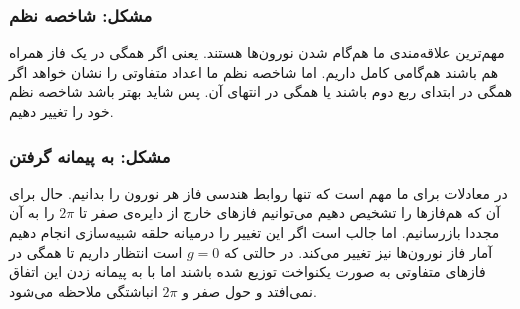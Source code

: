 \documentclass[12pt,onecolumn,a4paper]{article}
\begin{document}
\subsubsection{مشکل: شاخصه نظم}
مهم‌ترین علاقه‌مندی ما هم‌گام شدن نورون‌ها هستند. یعنی اگر همگی در یک فاز همراه هم باشند هم‌گامی کامل داریم. اما شاخصه نظم ما اعداد متفاوتی را نشان خواهد اگر همگی در ابتدای ربع دوم باشند یا همگی در انتهای آن. پس شاید بهتر باشد شاخصه نظم خود را تغییر دهیم.
\subsubsection{مشکل: به پیمانه گرفتن}
در معادلات برای ما مهم است که تنها روابط هندسی فاز هر نورون را بدانیم. حال برای آن که هم‌فازها را تشخیص دهیم می‌توانیم فاز‌های خارج از دایره‌ی صفر تا $2\pi$ را به آن مجددا بازرسانیم. اما جالب است اگر این تغییر را درمیانه حلقه شبیه‌سازی انجام دهیم آمار فاز نورون‌ها نیز تغییر می‌کند. در حالتی که $g=0$ است انتظار داریم تا همگی در فاز‌های متفاوتی به صورت یکنواخت توزیع شده باشند اما با به پیمانه زدن این اتفاق نمی‌افتد و حول صفر و $2\pi$ انباشتگی ملاحظه می‌شود.

\subsection{}


\newpage


\end{document}
